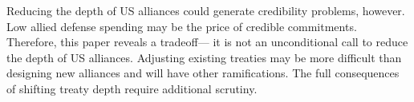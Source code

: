 \documentclass[12pt]{article}
\begin{document}
Reducing the depth of US alliances could generate credibility problems, however. 
Low allied defense spending may be the price of credible commitments.  
Therefore, this paper reveals a tradeoff--- it is not an unconditional call to reduce the depth of US alliances. 
Adjusting existing treaties may be more difficult than designing new alliances and will have other ramifications. 
The full consequences of shifting treaty depth require additional scrutiny. 

 



 
 
\end{document}
